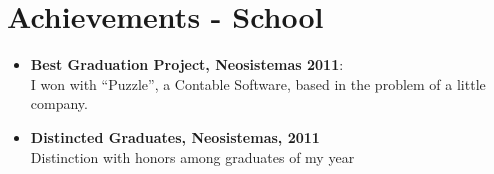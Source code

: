 \documentclass[a4paper,11pt]{article} %
\begin{document}

\section{Achievements - School}
\begin{itemize}
\item \textbf{Best Graduation Project, Neosistemas 2011}:\\
I won with ``Puzzle'', a Contable Software, based in the problem of a little company.
\item \textbf{Distincted Graduates, Neosistemas, 2011}\\
Distinction with honors among graduates of my year
\end{itemize}
\end{document}
